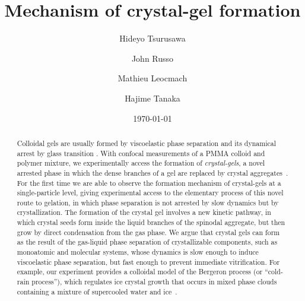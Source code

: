 \documentclass[twocolumn,superscriptaddress,showpacs,preprintnumbers,
amsmath,amssymb,prl]{revtex4-1}
\begin{document}
\title{Mechanism of crystal-gel formation}
\author{Hideyo Tsurusawa}
\author{John Russo}
\author{Mathieu Leocmach}
\author{Hajime Tanaka}


\date{\today}

\begin{abstract}
{
Colloidal gels are usually formed by viscoelastic phase separation and its dynamical arrest by glass transition \cite{tanaka1999colloid,tanaka2000viscoelastic,foffi2002,lu2008gelation,zaccarelli2008gelation,testard2011}.
With confocal measurements of a PMMA colloid and polymer mixture, we experimentally access the formation of \emph{crystal-gels}, a novel arrested phase in which the dense branches of a gel are replaced by crystal aggregates~\cite{fortini2008crystallization,perez2011pathways,sabin2012}. 
For the first time we are able to observe the formation mechanism of crystal-gels at a single-particle level, giving experimental access to the elementary process of this novel route to gelation, in which phase separation is not arrested by slow dynamics but by crystallization.
The formation of the crystal gel  involves a new kinetic pathway, in which crystal seeds form inside the liquid branches of the spinodal aggregate, but then grow by direct condensation from the gas phase.
We argue that crystal gels can form as the result of the gas-liquid phase separation of crystallizable components, such as monoatomic and molecular systems, whose dynamics is slow enough to induce viscoelastic phase separation, but fast enough to prevent immediate vitrification.
For example, our experiment provides a colloidal model of the Bergeron process (or ``cold-rain process''), which regulates ice crystal growth that occurs in mixed phase clouds containing a mixture of supercooled water and ice~\cite{glickman2000glossary}.
}
\end{abstract}
 
\end{document}
